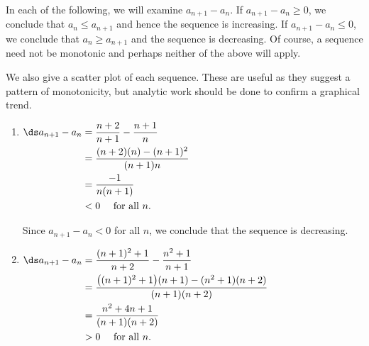 {In each of the following, we will examine $a_{n+1}-a_n$. If $a_{n+1}-a_n \ge0$, we conclude that $a_n\le a_{n+1}$ and hence the sequence is increasing. If $a_{n+1}-a_n\le0$, we conclude that $a_n\ge a_{n+1}$ and the sequence is decreasing. Of course, a sequence need not be monotonic and perhaps neither of the above will apply.


We also give a scatter plot of each sequence. These are useful as they suggest a pattern of monotonicity, but analytic work should be done to confirm a graphical trend.

\begin{enumerate}
\item
{}
	\hfill	$\ds\begin{aligned}[t] a_{n+1}-a_n &= \frac{n+2}{n+1} - \frac{n+1}{n} \\		
	&= \frac{(n+2)(n)-(n+1)^2}{(n+1)n} \\
	&=	\frac{-1}{n(n+1)} \\
	&<0 \quad\text{ for all $n$.}
\end{aligned}$ \hfill\null
				
Since $a_{n+1}-a_n<0$ for all $n$, we conclude that the sequence is decreasing.

\item
	\hfill $\ds \begin{aligned}[t]	
	a_{n+1}-a_n &= \frac{(n+1)^2+1}{n+2} - \frac{n^2+1}{n+1} \\		
	&= \frac{\big((n+1)^2+1\big)(n+1)- (n^2+1)(n+2)}{(n+1)(n+2)}\\
	&=	\frac{n^2+4n+1}{(n+1)(n+2)} \\
	&> 0 \quad \text{ for all $n$.}
\end{aligned}$\hfill \null
{}
					

\end{enumerate}}
